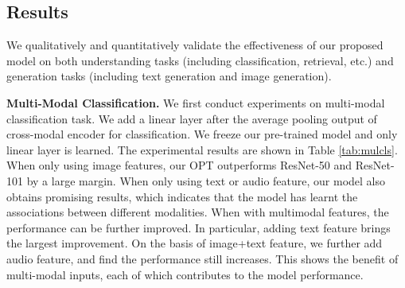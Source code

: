 \documentclass[10pt,twocolumn,letterpaper]{article}
\begin{document}
\subsection{Results}
We qualitatively and quantitatively validate the effectiveness of our proposed model on both understanding tasks (including classification, retrieval, etc.) and generation tasks (including text generation and image generation).

\textbf{Multi-Modal Classification.} We first conduct experiments on multi-modal classification task. We add a linear layer after the average pooling output of cross-modal encoder for classification. We freeze our pre-trained model and only linear layer is learned. The experimental results are shown in Table \ref{tab:mulcls}. When only using image features, our OPT outperforms ResNet-50 and ResNet-101 by a large margin. When only using text or audio feature, our model also obtains promising results, which indicates that the model has learnt the associations between different modalities. When with multimodal features, the performance can be further improved. In particular, adding text feature brings the largest improvement. On the basis of image+text feature, we further add audio feature, and find the performance still increases. This shows the benefit of multi-modal inputs, each of which contributes to the model performance.  

\begin{table}[!t]
\begin{center}
\caption{Results on cross-modal retrieval task. The performance is evaluated on OpenImages-5K test set. ``A $\to$ B'' means using A to retrieve B.}
\label{tab:mulret}
\end{center}
\end{table}
\end{document}
